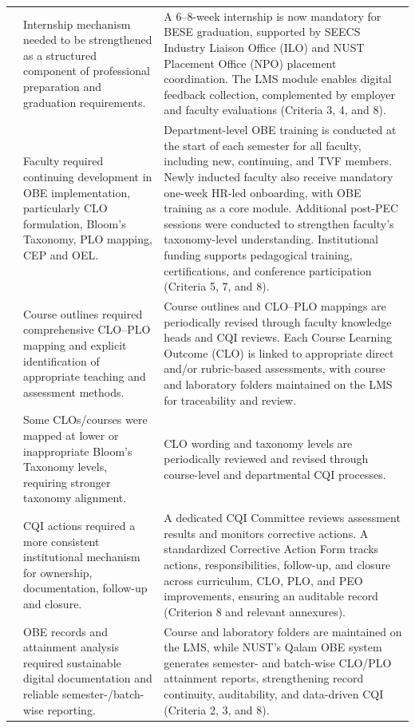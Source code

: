 \begin{longtable}{@{}>{\centering\arraybackslash}p{}>{\raggedright\arraybackslash}p{}>{\raggedright\arraybackslash}p{}@{}}
\addlinespace[2pt]
10 & Internship mechanism needed to be strengthened as a structured component of professional preparation and graduation requirements. & A 6–8-week internship is now mandatory for BESE graduation, supported by SEECS Industry Liaison Office (ILO) and NUST Placement Office (NPO) placement coordination. The LMS module enables digital feedback collection, complemented by employer and faculty evaluations (Criteria 3, 4, and 8).\\
\addlinespace[2pt]
11 & Faculty required continuing development in OBE implementation, particularly CLO formulation, Bloom's Taxonomy, PLO mapping, CEP and OEL. & 
Department-level OBE training is conducted at the start of each semester for all faculty, including new, continuing, and TVF members. Newly inducted faculty also receive mandatory one-week HR-led onboarding, with OBE training as a core module. Additional post-PEC sessions were conducted to strengthen faculty's taxonomy-level understanding. Institutional funding supports pedagogical training, certifications, and conference participation (Criteria 5, 7, and 8).\\
\addlinespace[2pt]
12 & Course outlines required comprehensive CLO--PLO mapping and explicit identification of appropriate teaching and assessment methods. & Course outlines and CLO–PLO mappings are periodically revised through faculty knowledge heads and CQI reviews. Each Course Learning Outcome (CLO) is linked to appropriate direct and/or rubric-based assessments, with course and laboratory folders maintained on the LMS for traceability and review.\\
\addlinespace[2pt]
13 & Some CLOs/courses were mapped at lower or inappropriate Bloom's Taxonomy levels, requiring stronger taxonomy alignment. & CLO wording and taxonomy levels are periodically reviewed and revised through course-level and departmental CQI processes.\\
\addlinespace[2pt]
14 & CQI actions required a more consistent institutional mechanism for ownership, documentation, follow-up and closure. & A dedicated CQI Committee reviews assessment results and monitors corrective actions. A standardized Corrective Action Form tracks actions, responsibilities, follow-up, and closure across curriculum, CLO, PLO, and PEO improvements, ensuring an auditable record (Criterion 8 and relevant annexures).\\
\addlinespace[2pt]
15 & OBE records and attainment analysis required sustainable digital documentation and reliable semester-/batch-wise reporting. & Course and laboratory folders are maintained on the LMS, while NUST’s Qalam OBE system generates semester- and batch-wise CLO/PLO attainment reports, strengthening record continuity, auditability, and data-driven CQI (Criteria 2, 3, and 8).\\

\end{longtable}
